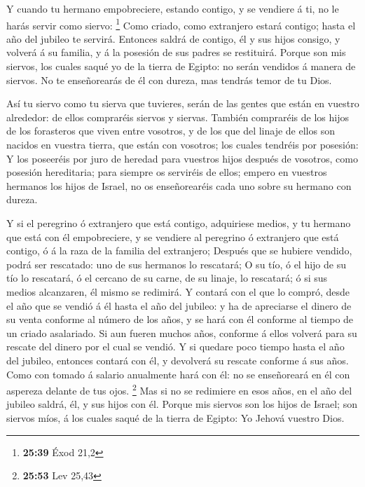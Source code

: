  Y cuando tu hermano empobreciere, estando contigo, y se
vendiere á ti, no le harás servir como siervo: \footnote{\textbf{25:39}
  Éxod 21,2}  Como criado, como extranjero estará contigo;
hasta el año del jubileo te servirá.  Entonces saldrá de
contigo, él y sus hijos consigo, y volverá á su familia, y á la posesión
de sus padres se restituirá.  Porque son mis siervos, los
cuales saqué yo de la tierra de Egipto: no serán vendidos á manera de
siervos.  No te enseñorearás de él con dureza, mas tendrás
temor de tu Dios.

 Así tu siervo como tu sierva que tuvieres, serán de las
gentes que están en vuestro alrededor: de ellos compraréis siervos y
siervas.  También compraréis de los hijos de los forasteros
que viven entre vosotros, y de los que del linaje de ellos son nacidos
en vuestra tierra, que están con vosotros; los cuales tendréis por
posesión:  Y los poseeréis por juro de heredad para
vuestros hijos después de vosotros, como posesión hereditaria; para
siempre os serviréis de ellos; empero en vuestros hermanos los hijos de
Israel, no os enseñorearéis cada uno sobre su hermano con dureza.

 Y si el peregrino ó extranjero que está contigo,
adquiriese medios, y tu hermano que está con él empobreciere, y se
vendiere al peregrino ó extranjero que está contigo, ó á la raza de la
familia del extranjero;  Después que se hubiere vendido,
podrá ser rescatado: uno de sus hermanos lo rescatará;  O
su tío, ó el hijo de su tío lo rescatará, ó el cercano de su carne, de
su linaje, lo rescatará; ó si sus medios alcanzaren, él mismo se
redimirá.  Y contará con el que lo compró, desde el año que
se vendió á él hasta el año del jubileo: y ha de apreciarse el dinero de
su venta conforme al número de los años, y se hará con él conforme al
tiempo de un criado asalariado.  Si aun fueren muchos años,
conforme á ellos volverá para su rescate del dinero por el cual se
vendió.  Y si quedare poco tiempo hasta el año del jubileo,
entonces contará con él, y devolverá su rescate conforme á sus años.
 Como con tomado á salario anualmente hará con él: no se
enseñoreará en él con aspereza delante de tus ojos. \footnote{\textbf{25:53}
  Lev 25,43}  Mas si no se redimiere en esos años, en el
año del jubileo saldrá, él, y sus hijos con él.  Porque mis
siervos son los hijos de Israel; son siervos míos, á los cuales saqué de
la tierra de Egipto: Yo Jehová vuestro Dios.

